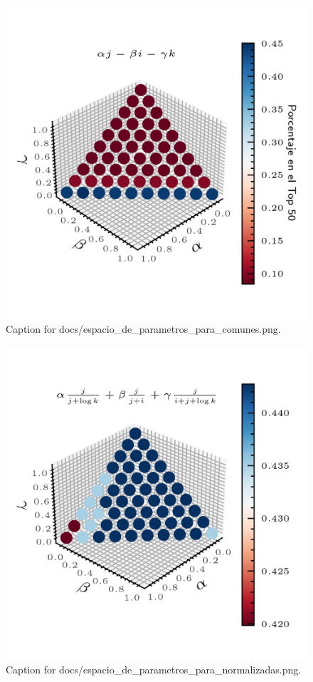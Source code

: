 \documentclass{article}
\begin{document}
\begin{figure}[h] \centering \includegraphics{docs/espacio_de_parametros_para_comunes.png} \caption{Caption for docs/espacio_de_parametros_para_comunes.png.} \end{figure}
\begin{figure}[h] \centering \includegraphics{docs/espacio_de_parametros_para_normalizadas.png} \caption{Caption for docs/espacio_de_parametros_para_normalizadas.png.} \end{figure}
\end{document}
